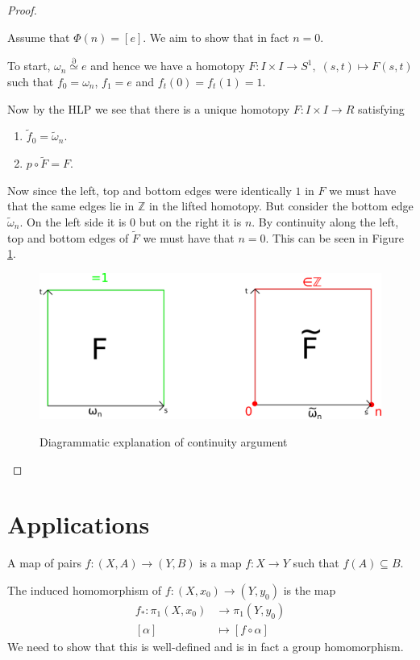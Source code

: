 \documentclass[11pt]{article}
\newcommand{\homrel}{\stackrel{\partial}{\simeq}}
\newcommand{\Z}{\mathbb{Z}}
\newenvironment{defin}
	{\begin{mdframed}[backgroundcolor=white, roundcorner=5pt, linewidth=1pt]
		\setlength{\parindent}{0pt}
		}
	{\end{mdframed}}
\newcommand{\mdf}[1]{{\color{red} #1}}
\begin{document}
\begin{proof}
\begin{itemize}
		Assume that $\Phi(n)=[e]$.
		We aim to show that in fact $n=0$.

		To start, $\omega_n\homrel e$ and hence we have a homotopy $F:I\times I\to S^1,\;(s, t)\mapsto F(s, t)$ such that $f_0=\omega_n$, $f_1=e$ and $f_t(0)=f_t(1)=1$.

		Now by the HLP we see that there is a unique homotopy $F:I\times I \to R$ satisfying
		\begin{enumerate}[label=(\roman*)]
			\item $\widetilde{f}_0=\widetilde{\omega}_n$.
			\item $p\circ \widetilde{F}=F$.
		\end{enumerate}

		Now since the left, top and bottom edges were identically $1$ in $F$ we must have that the same edges lie in $\Z$ in the lifted homotopy.
		But consider the bottom edge $\widetilde{\omega}_n$.
		On the left side it is $0$ but on the right it is $n$.
		By continuity along the left, top and bottom edges of $\widetilde{F}$ we must have that $n=0$.
		This can be seen in Figure \ref{fig:circlepi1}.
		\begin{figure}[ht]
			\centering
			\includegraphics{circlepi1.png}
			\label{fig:circlepi1}
			\caption{Diagrammatic explanation of continuity argument}
		\end{figure}	
\end{itemize}
\end{proof}

\section{Applications}
\begin{defin}
	A \mdf{map of pairs} $f:(X,A)\to(Y, B)$ is a map $f:X\to Y$ such that $f(A)\subseteq B$.	

	The \mdf{induced homomorphism} of $f:(X, x_0)\to (Y, y_0)$ is the map
	\begin{align*}	
		f_\ast:\pi_1(X, x_0)&\to \pi_1(Y,y_0)\\
		[\alpha] &\mapsto [f \circ \alpha]
	\end{align*}
	We need to show that this is well-defined and is in fact a group homomorphism.
\end{defin}
\end{document}
